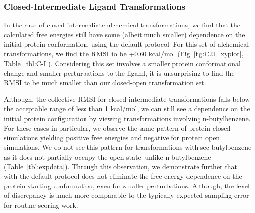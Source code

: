 \documentclass[journal=jctcce,manuscript=article]{achemso}
\begin{document}
\subsubsection*{Closed-Intermediate Ligand Transformations}
In the case of closed-intermediate alchemical transformations, we find that the calculated free energies still have some (albeit much smaller) dependence on the initial protein conformation, using the default protocol.
For this set of alchemical transformations, we find the RMSI to be +0.60 kcal/mol (Fig~\ref{fig:C2I_xyplot}, Table~\ref{tbl:C-I}).
Considering this set involves a smaller protein conformational change and smaller perturbations to the ligand, it is unsurprising to find the RMSI to be much smaller than our closed-open transformation set.

Although, the collective RMSI for closed-intermediate transformations falls below the acceptable range of less than 1 kcal/mol, we can still see a dependence on the initial protein configuration by viewing transformations involving n-butylbenzene.
For these cases in particular, we observe the same pattern of protein closed simulations yielding positive free energies and negative for protein open simulations. 
We do not see this pattern for transformations with sec-butylbenzene as it does not partially occupy the open state, unlike n-butylbenzene (Table~\ref{tbl:expdata}).
Through this observation, we demonstrate further that with the default protocol does not eliminate the free energy dependence on the protein starting conformation, even for smaller perturbations. 
Although, the level of discrepancy is much more comparable to the typically expected sampling error for routine scoring work.
\end{document}
